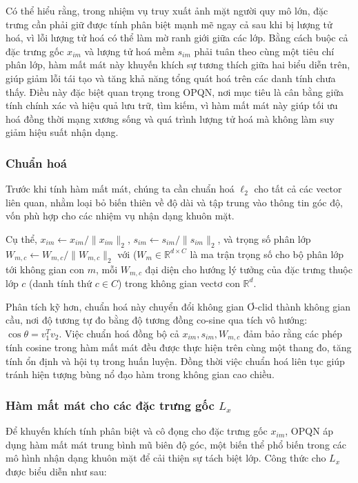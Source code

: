 Có thể hiểu rằng, trong nhiệm vụ truy xuất ảnh mặt người quy mô lớn, đặc trưng cần phải giữ được tính phân biệt mạnh mẽ ngay cả sau khi bị lượng tử hoá, vì lỗi lượng tử hoá có thể làm mờ ranh giới giữa các lớp. Bằng cách buộc cả đặc trưng gốc $x_{im}$ và lượng tử hoá mềm $s_{im}$ phải tuân theo cùng một tiêu chí phân lớp, hàm mất mát này khuyến khích sự tương thích giữa hai biểu diễn trên, giúp giảm lỗi tái tạo và tăng khả năng tổng quát hoá trên các danh tính chưa thấy. Điều này đặc biệt quan trọng trong OPQN, nơi mục tiêu là cân bằng giữa tính chính xác và hiệu quả lưu trữ, tìm kiếm, vì hàm mất mát này giúp tối ưu hoá đồng thời mạng xương sống và quá trình lượng tử hoá mà không làm suy giảm hiệu suất nhận dạng.

\subsubsection{Chuẩn hoá}
Trước khi tính hàm mất mát, chúng ta cần chuẩn hoá $\ell_2$ cho tất cả các vector liên quan, nhằm loại bỏ biến thiên về độ dài và tập trung vào thông tin góc độ, vốn phù hợp cho các nhiệm vụ nhận dạng khuôn mặt. 

Cụ thể, $ x_{im} \leftarrow x_{im} / \|x_{im}\|_2 $, $s_{im} \leftarrow s_{im} / \|s_{im}\|_2$, và trọng số phân lớp $W_{m,c} \leftarrow W_{m,c} / \|W_{m,c}\|_2$ với ($W_m \in \mathbb{R}^{d \times C}$ là ma trận trọng số cho bộ phân lớp tới không gian con $m$, mỗi $W_{m,c}$ đại diện cho hướng lý tưởng của đặc trưng thuộc lớp $c$ (danh tính thứ $c \in C$) trong không gian vectơ con $\mathbb{R}^d$. 

Phân tích kỹ hơn, chuẩn hoá này chuyển đổi không gian Ơ-clid thành không gian cầu, nơi độ tương tự đo bằng độ tương đồng co-sine qua tích vô hướng: $\cos \theta = v^T_1 v_2$. Việc chuẩn hoá đồng bộ cả $x_{im}, s_{im}, W_{m,c}$ đảm bảo rằng các phép tính cosine trong hàm mất mát đều được thực hiện trên cùng một thang đo, tăng tính ổn định và hội tụ trong huấn luyện. Đồng thời việc chuẩn hoá liên tục giúp tránh hiện tượng bùng nổ đạo hàm trong không gian cao chiều.

\subsubsection{Hàm mất mát cho các đặc trưng gốc $L_x$}
Để khuyến khích tính phân biệt và cô đọng cho đặc trưng gốc $x_{im}$, OPQN áp dụng hàm mất mát trung bình mũ biên độ góc, một biến thể phổ biến trong các mô hình nhận dạng khuôn mặt để cải thiện sự tách biệt lớp. Công thức cho $L_x$ được biểu diễn như sau:

